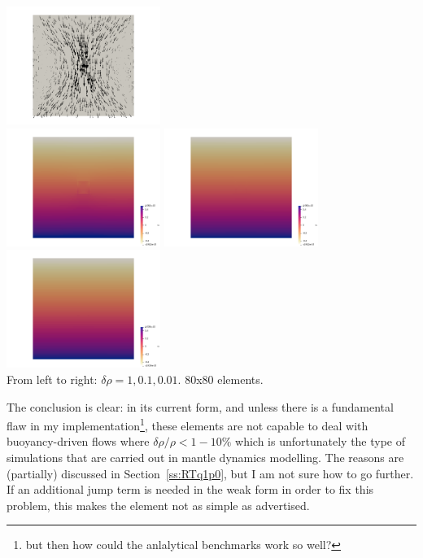 \begin{center}
\includegraphics[width=5cm]{python_codes/fieldstone_77/results/block/drho/vels2}\\
\includegraphics[width=5cm]{python_codes/fieldstone_77/results/block/drho/press1}
\includegraphics[width=5cm]{python_codes/fieldstone_77/results/block/drho/press3}
\includegraphics[width=5cm]{python_codes/fieldstone_77/results/block/drho/press2}\\
{\captionfont From left to right: $\delta \rho=1,0.1,0.01$. 80x80 elements.}
\end{center}

The conclusion is clear: in its current form, and unless there is a fundamental 
flaw in my implementation\footnote{but then how could the anlalytical benchmarks work 
so well?}, these elements are not capable to 
deal with buoyancy-driven flows where $\delta \rho/\rho < 1-10\%$ which is 
unfortunately the type of simulations that are carried out in mantle dynamics modelling.
The reasons are (partially) discussed in Section~\ref{ss:RTq1p0}, but 
I am not sure how to go further. If an additional jump term is needed in the 
weak form in order to fix this problem, this makes the element not as simple as
advertised. 



